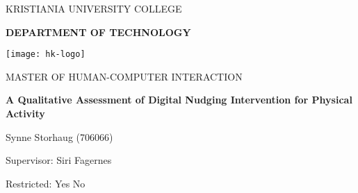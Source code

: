 \begin{titlepage}
    \begin{center}
        \large
        \MakeUppercase{KRISTIANIA UNIVERSITY COLLEGE}
        
        \LARGE
        \textbf{\MakeUppercase{DEPARTMENT OF TECHNOLOGY}}
        
        \vspace{1cm}
        \texttt{[image: hk-logo]}
        
        \vspace{1cm}
        \Large
        \MakeUppercase{MASTER OF HUMAN-COMPUTER INTERACTION}
        
        \vspace{0.5cm}
        \LARGE
        \textbf{A Qualitative Assessment of Digital Nudging Intervention for Physical Activity}
        
        \vspace{0.5cm}
        \Large
        Synne Storhaug (706066)
        
        \vspace{3.5cm}
        \large
        Supervisor: Siri Fagernes 

        \vspace{1.5cm}        
        Restricted:
        \uncheckedbox Yes
        \checkedbox No
    \end{center}
\end{titlepage}